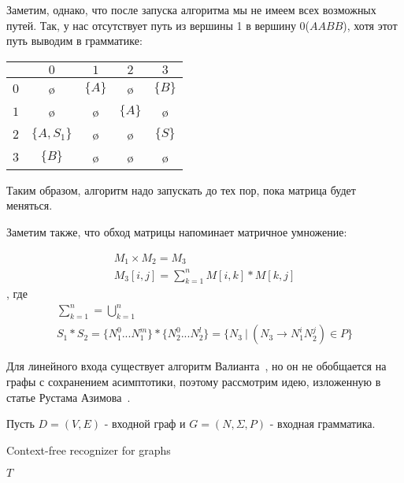 Заметим, однако, что после запуска алгоритма мы не имеем всех возможных путей. Так, у нас отсутствует путь из вершины 1 в вершину 0($AABB$), хотя этот путь выводим в грамматике:

\begin{center}
	\begin{tabular}{c||cc|cc}
		& $0$ & $1$ & $2$ & $3$ \\ \hline \hline 
		$0$ & \o & $\{A\}$ & \o & $\{B\}$ \\ 
		$1$ & \o  & \o & $\{A\}$ & \o \\ 
		$2$ &  $\{A, S_1\}$ &  \o & \o & $\{S\}$ \\ \hline
		$3$ & $\{B\}$  & \o  & \o  & \o \\ 
	\end{tabular}
\end{center}

Таким образом, алгоритм надо запускать до тех пор, пока матрица будет меняться.

\smallskip

Заметим также, что обход матрицы напоминает матричное умножение:

\begin{gather*}
M_1 \times M_2 = M_3 \\
M_3[i,j] = \sum_{k=1}^{n} M[i,k] * M[k,j]
\end{gather*}
, где
\begin{gather*}
\sum_{k=1}^{n} = \bigcup_{k=1}^{n} \\
S_1 * S_2 = \{N_1^0 ... N_1^m\} * \{N_2^0 ... N_2^l\} = \{N_3~|~(N_3 \rightarrow N_1^i N_2^j) \in P\}
\end{gather*}

Для линейного входа существует алгоритм Валианта~\cite{Valiant:1975:GCR:1739932.1740048}, но он не обобщается на графы с сохранением асимптотики, поэтому рассмотрим идею, изложенную в статье Рустама Азимова~\cite{Azimov:2018:CPQ:3210259.3210264}.

Пусть $D = (V, E)$ - входной граф и $G = (N,\Sigma,P)$ - входная грамматика.

\begin{algorithm}[H]
\begin{algorithmic}[1]
\caption{Context-free recognizer for graphs}
\label{alg:graphParse}
    
    \EndFor    
       
    \EndWhile
\State \Return $T$
\EndFunction
\end{algorithmic}
\end{algorithm}


